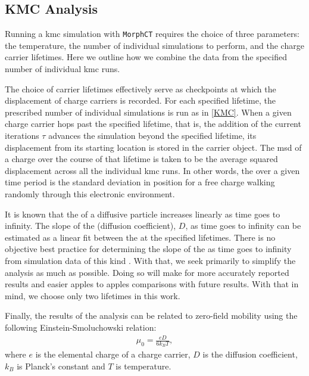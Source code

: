 \subsection{KMC Analysis}

\label{kmcanalysis}


Running a \gls{kmc} simulation with \texttt{MorphCT} requires the choice of three parameters: the
 temperature, the number of individual 
simulations to perform, and the charge carrier lifetimes. Here we outline how
we combine the data from the specified number of individual \gls{kmc} runs.  

The choice of carrier lifetimes effectively serve as checkpoints at which the displacement of charge carriers is recorded. For
each specified lifetime, the prescribed number of individual  simulations is run as in \autoref{KMC}. When a
given charge carrier hops past the specified lifetime, that is, the addition of the current iterations 
$\tau$ advances the simulation beyond the specified lifetime, 
its displacement from its starting location is stored in the carrier object. 
The \gls{msd} of a charge over the course of that lifetime is taken to be the
average squared displacement across all the individual \gls{kmc} runs. 
In other words, the  over a given time period is 
the standard deviation in position for a free charge walking randomly through this electronic environment. 

It is known that the  of a diffusive particle increases linearly as time goes to infinity. 
The slope of the  (diffusion coefficient), $D$, as time
goes to infinity can be estimated as a linear fit between the  at the specified lifetimes.
There is no objective best practice for determining the slope of the  as
time goes to infinity from simulation data of this kind \cite{Maginn2018}. With that, we seek primarily to
simplify the  analysis as much as possible. Doing so will make for more accurately reported results and
easier apples to apples comparisons with future results. With that in mind, we choose only two lifetimes in
this work.

Finally, the results of the  analysis can be related to  zero-field mobility using the following Einstein-Smoluchowski relation:
\begin{align}
    \label{einstein}
    \mu_{0} = \frac{eD}{6k_{B}T},
\end{align}
where $e$ is the elemental charge of a charge carrier, $D$ is the diffusion coefficient, $k_{B}$ is Planck's
constant and $T$ is temperature. 


